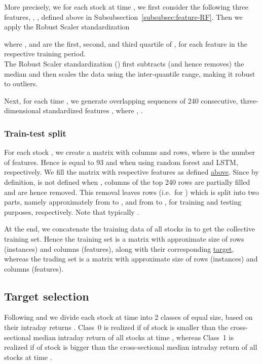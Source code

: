 \documentclass[review]{elsarticle}
\begin{document}
More precisely, we for each stock  at time , we first consider the following three features, , ,  defined above in Subsubsection~\ref{subsubsec:feature-RF}. Then we apply the Robust Scaler standardization 

where ,  and  are the first, second, and third quartile of , 
for each feature  in the respective training period.
\\
The Robust Scaler standardization (\cite{pedregosa2011scikit}) first subtracts (and hence removes) the median and then scales the data using the inter-quantile range, making it robust to  outliers.

Next, for each time , we generate overlapping sequences  of  240  consecutive, three-dimensional standardized features  , where 
, .



\subsubsection{Train-test split}

For each stock , we create a matrix with  columns and  rows, where  is the number of features. Hence  is equal to 93 and  when using random forest and LSTM, respectively. We fill the matrix with respective  features as defined \hyperref[subsec:features]{above}. 
Since by definition,  is not defined when , columns of the top 240 rows are partially filled and are hence removed. This removal leaves 
 rows (i.e.\ for ) which is split into two parts, namely  approximately from  to , and  from  to , for training and testing purposes, respectively. Note that typically .
\par
At the end, we concatenate the training data of all stocks in  to get the collective training set. Hence the training set is a matrix with approximate size of  rows (instances) and  columns (features), along with their corresponding \hyperref[subsec:target]{target}, whereas the 
 trading set is a matrix with approximate size of  rows (instances) and  columns (features).
\subsection{Target selection}
\label{subsec:target}
Following \cite{takeuchi2013} and \cite{krauss18} we divide  each 
stock at time   into 2 classes of equal size, based on their intraday returns . Class~0 is realized if  of stock  is smaller than the cross-sectional median intraday return of all stocks at time , whereas  Class~1 is realized if  of stock  is bigger than the cross-sectional median intraday return of all stocks at time .
\end{document}

